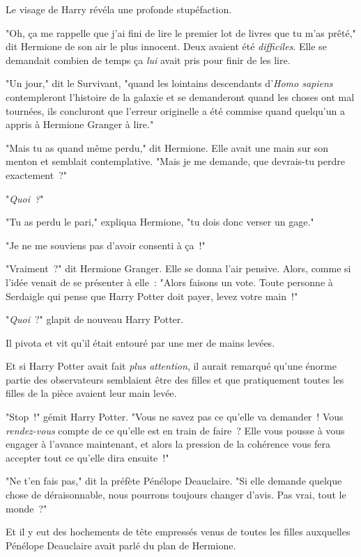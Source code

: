 Le visage de Harry révéla une profonde stupéfaction.

"Oh, ça me rappelle que j'ai fini de lire le premier lot de livres que tu m'as prêté," dit Hermione de son air le plus innocent. Deux avaient été \emph{difficiles}. Elle se demandait combien de temps ça \emph{lui} avait pris pour finir de les lire.

"Un jour," dit le Survivant, "quand les lointains descendants d'\emph{Homo sapiens} contempleront l'histoire de la galaxie et se demanderont quand les choses ont mal tournées, ils concluront que l'erreur originelle a été commise quand quelqu'un a appris à Hermione Granger à lire."

"Mais tu as quand même perdu," dit Hermione. Elle avait une main sur son menton et semblait contemplative. "Mais je me demande, que devrais-tu perdre exactement~?"

"\emph{Quoi~?}"

"Tu as perdu le pari," expliqua Hermione, "tu dois donc verser un gage."

"Je ne me souviens pas d'avoir consenti à ça~!"

"Vraiment~?" dit Hermione Granger. Elle se donna l'air pensive. Alors, comme si l'idée venait de se présenter à elle~: "Alors faisons un vote. Toute personne à Serdaigle qui pense que Harry Potter doit payer, levez votre main~!"

"\emph{Quoi}~?" glapit de nouveau Harry Potter.

Il pivota et vit qu'il était entouré par une mer de mains levées.

Et si Harry Potter avait fait \emph{plus attention}, il aurait remarqué qu'une énorme partie des observateurs semblaient être des filles et que pratiquement toutes les filles de la pièce avaient leur main levée.

"Stop~!" gémit Harry Potter. "Vous ne savez pas ce qu'elle va demander~! Vous \emph{rendez-vous} compte de ce qu'elle est en train de faire~? Elle vous pousse à vous engager à l'avance maintenant, et alors la pression de la cohérence vous fera accepter tout ce qu'elle dira ensuite~!"

"Ne t'en fais pas," dit la préfète Pénélope Deauclaire. "Si elle demande quelque chose de déraisonnable, nous pourrons toujours changer d'avis. Pas vrai, tout le monde~?"

Et il y eut des hochements de tête empressés venus de toutes les filles auxquelles Pénélope Deauclaire avait parlé du plan de Hermione.

